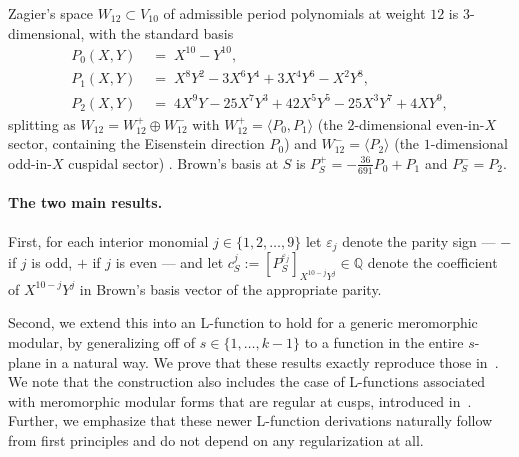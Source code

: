 \documentclass[11pt,letterpaper]{article}
\newcommand{\QQ}{\mathbb{Q}}
\newcommand{\eps}{\varepsilon}
\begin{document}
Zagier's space $W_{12} \subset V_{10}$ of admissible period polynomials
at weight $12$ is $3$-dimensional, with the standard basis
\begin{equation}\label{eq:Zagier-basis}
\begin{aligned}
  P_0(X,Y) &\;=\; X^{10} - Y^{10},\\
  P_1(X,Y) &\;=\; X^8 Y^2 - 3 X^6 Y^4 + 3 X^4 Y^6 - X^2 Y^8,\\
  P_2(X,Y) &\;=\; 4 X^9 Y - 25 X^7 Y^3 + 42 X^5 Y^5 - 25 X^3 Y^7 + 4 X Y^9,
\end{aligned}
\end{equation}
splitting as $W_{12} = W_{12}^+ \oplus W_{12}^-$ with
$W_{12}^+ = \langle P_0, P_1\rangle$ (the $2$-dimensional even-in-$X$
sector, containing the Eisenstein direction $P_0$) and
$W_{12}^- = \langle P_2\rangle$ (the $1$-dimensional odd-in-$X$ cuspidal
sector) \cite{KZ1984}.  Brown's basis at $S$ \cite[\S 8.2]{Brown2017} is
$P^+_S = -\tfrac{36}{691} P_0 + P_1$ and $P^-_S = P_2$.

\paragraph{The two main results.} 
First, for each interior monomial $j \in \{1, 2, \ldots, 9\}$ let $\eps_j$
denote the parity sign --- $-$ if $j$ is odd, $+$ if $j$ is even --- and
let $c_S^j := [P^{\eps_j}_S]_{X^{10-j}Y^j} \in \QQ$ denote the
coefficient of $X^{10-j}Y^j$ in Brown's basis vector of the appropriate
parity.

Second, we extend this into an L-function to hold for a generic meromorphic 
modular, by generalizing off of $s \in \{ 1, \ldots, k-1\}$ to a function 
in the entire $s$-plane in a natural way. We prove that these results exactly
reproduce those in~\cite{BFK2011}. We note that the construction also includes 
the case of L-functions associated with meromorphic modular forms that are 
regular at cusps, introduced in~\cite{1806}. Further, we emphasize that these 
newer L-function derivations naturally follow from first principles and do not 
depend on any regularization at all.
\end{document}
